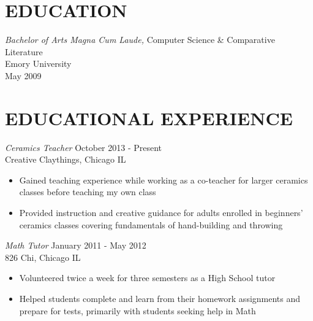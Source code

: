\documentclass[line,margin]{res}
\begin{document}
\address{waltaskew@gmail.com}
\address{404-819-9796}

\begin{resume}
 
\section{EDUCATION}
        {\sl Bachelor of Arts Magna Cum Laude,} 
        Computer Science \& Comparative Literature \\
        Emory University \\
        May 2009
 
\section{EDUCATIONAL EXPERIENCE} 
        {\sl Ceramics Teacher} \hfill October 2013 - Present \\
        Creative Claythings, Chicago IL
        \begin{itemize}
          \item Gained teaching experience while working as a
            co-teacher for larger ceramics classes  before teaching my
            own class 
          \item Provided instruction and creative guidance for adults
            enrolled in beginners' ceramics classes covering
            fundamentals of hand-building and throwing
        \end{itemize}

        {\sl Math Tutor} \hfill January 2011 - May 2012 \\
        826 Chi, Chicago IL
        \begin{itemize}
        \item Volunteered twice a week for three semesters as a High
          School tutor
        \item Helped students complete and learn from their homework
          assignments and prepare for tests, primarily
          with students seeking help in Math
        \end{itemize}


\end{resume}
\end{document}
